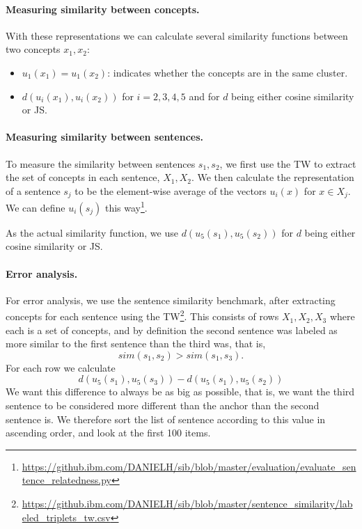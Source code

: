 \documentclass[11pt,a4paper]{article}
\begin{document}
\paragraph{Measuring similarity between concepts.}

With these representations we can calculate several similarity functions
between two concepts $x_1,x_2$:
\begin{itemize}
\item $u_1(x_1)=u_1(x_2)$:
  indicates whether the concepts are in the same cluster.
\item $d(u_i(x_1),u_i(x_2))$ for $i=2,3,4,5$ and for $d$ being either
  cosine similarity or JS.
\end{itemize}


\paragraph{Measuring similarity between sentences.}

To measure the similarity between sentences $s_1,s_2$, we first use the TW
to extract the set of concepts in each sentence, $X_1,X_2$.
We then calculate the representation of a sentence $s_j$ to be the element-wise average
of the vectors $u_i(x)$ for $x\in X_j$.
We can define $u_i(s_j)$ this
way\footnote{\url{https://github.ibm.com/DANIELH/sib/blob/master/evaluation/evaluate_sentence_relatedness.py}}.

As the actual similarity function, we use $d(u_5(s_1),u_5(s_2))$ for $d$ being either
  cosine similarity or JS.
  
\paragraph{Error analysis.}
For error analysis, we use the sentence similarity benchmark,
after extracting concepts for each sentence using the
TW\footnote{\url{https://github.ibm.com/DANIELH/sib/blob/master/sentence_similarity/labeled_triplets_tw.csv}}.
This consists of rows $X_1,X_2,X_3$ where each is a set of concepts,
and by definition the second sentence was labeled as more similar to the first
sentence than the third was, that is,
\[
sim(s_1,s_2)>sim(s_1,s_3).
\]
For each row we calculate
\[
d(u_5(s_1),u_5(s_3)) - d(u_5(s_1),u_5(s_2))
\]
We want this difference to always be as big as possible,
that is, we want the third sentence to be considered more different than
the anchor than the second sentence is.
We therefore sort the list of sentence according to this value
in ascending order, and look at the first 100 items.



\end{document}
